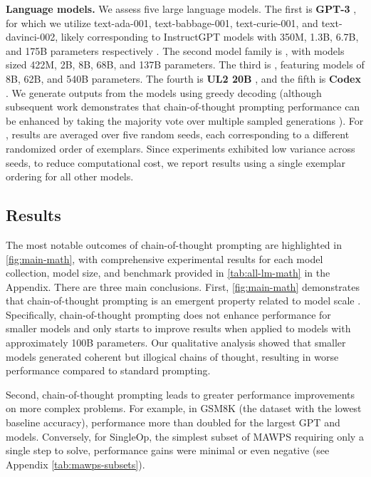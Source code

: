 \textbf{Language models.} We assess five large language models. The first is \textbf{GPT-3} \citep{brown2020language}, for which we utilize text-ada-001, text-babbage-001, text-curie-001, and text-davinci-002, likely corresponding to InstructGPT models with 350M, 1.3B, 6.7B, and 175B parameters respectively \citep{ouyang2022training}. The second model family is \textbf{\lamda{}} \citep{thoppilan2022lamda}, with models sized 422M, 2B, 8B, 68B, and 137B parameters. The third is \textbf{\palm{}}, featuring models of 8B, 62B, and 540B parameters. The fourth is \textbf{UL2 20B} \citep{tay2022unifying}, and the fifth is \textbf{Codex} \citep[][code-davinci-002 in the OpenAI API]{chen2021evaluating}. We generate outputs from the models using greedy decoding (although subsequent work demonstrates that chain-of-thought prompting performance can be enhanced by taking the majority vote over multiple sampled generations \citep{wang2022self}). For \lamda{}, results are averaged over five random seeds, each corresponding to a different randomized order of exemplars. Since \lamda{} experiments exhibited low variance across seeds, to reduce computational cost, we report results using a single exemplar ordering for all other models.

\subsection{Results}
The most notable outcomes of chain-of-thought prompting are highlighted in \cref{fig:main-math}, with comprehensive experimental results for each model collection, model size, and benchmark provided in \cref{tab:all-lm-math} in the Appendix. There are three main conclusions. First, \cref{fig:main-math} demonstrates that chain-of-thought prompting is an emergent property related to model scale \citep{wei2022emergent}. Specifically, chain-of-thought prompting does not enhance performance for smaller models and only starts to improve results when applied to models with approximately 100B parameters. Our qualitative analysis showed that smaller models generated coherent but illogical chains of thought, resulting in worse performance compared to standard prompting.


Second, chain-of-thought prompting leads to greater performance improvements on more complex problems. For example, in GSM8K (the dataset with the lowest baseline accuracy), performance more than doubled for the largest GPT and \palm{} models. Conversely, for SingleOp, the simplest subset of MAWPS requiring only a single step to solve, performance gains were minimal or even negative (see Appendix \cref{tab:mawps-subsets}).

